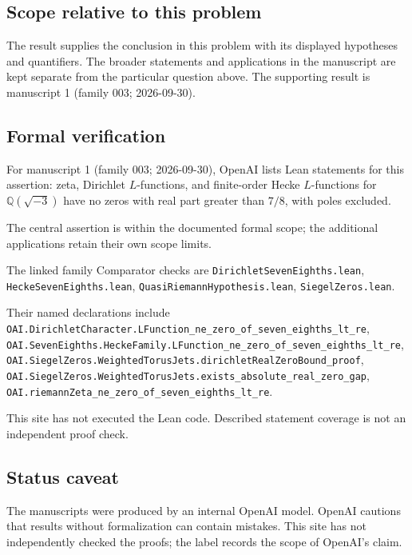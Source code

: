 \documentclass[11pt]{article}
\begin{document}
\subsection{Scope relative to this problem}
The result supplies the conclusion in this problem with its displayed hypotheses and quantifiers. The broader statements and applications in the manuscript are kept separate from the particular question above. The supporting result is manuscript 1 (family 003; 2026-09-30).

\subsection{Formal verification}
For manuscript 1 (family 003; 2026-09-30), OpenAI lists Lean statements for this assertion: zeta, Dirichlet $L$-functions, and finite-order Hecke $L$-functions for $\mathbb Q(\sqrt{-3})$ have no zeros with real part greater than $7/8$, with poles excluded.

The central assertion is within the documented formal scope; the additional applications retain their own scope limits.

The linked family Comparator checks are \texttt{DirichletSevenEighths.lean}, \texttt{HeckeSevenEighths.lean}, \texttt{QuasiRiemannHypothesis.lean}, \texttt{SiegelZeros.lean}.

Their named declarations include \texttt{OAI.DirichletCharacter.LFunction\_ne\_zero\_of\_seven\_eighths\_lt\_re}, \texttt{OAI.SevenEighths.HeckeFamily.LFunction\_ne\_zero\_of\_seven\_eighths\_lt\_re}, \texttt{OAI.SiegelZeros.WeightedTorusJets.dirichletRealZeroBound\_proof}, \texttt{OAI.SiegelZeros.WeightedTorusJets.exists\_absolute\_real\_zero\_gap}, \texttt{OAI.riemannZeta\_ne\_zero\_of\_seven\_eighths\_lt\_re}.

This site has not executed the Lean code. Described statement coverage is not an independent proof check.

\subsection{Status caveat}
The manuscripts were produced by an internal OpenAI model. OpenAI cautions that results without formalization can contain mistakes. This site has not independently checked the proofs; the label records the scope of OpenAI's claim.
\end{document}
